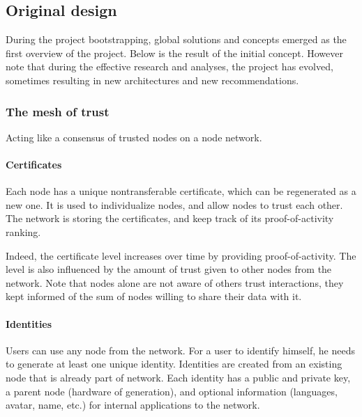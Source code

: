 
\subsection{Original design}
During the project bootstrapping, global solutions and concepts emerged as the first overview of the project. Below is the result of the initial concept. However note that during the effective research and analyses, the project has evolved, sometimes resulting in new architectures and new recommendations.

\subsubsection{The mesh of trust}
Acting like a consensus of trusted nodes on a node network.

\paragraph{Certificates} Each node has a unique nontransferable certificate, which can be regenerated as a new one. It is used to individualize nodes, and allow nodes to trust each other. The network is storing the certificates, and keep track of its proof-of-activity\cite{Bentov2013ProofStake} ranking.

Indeed, the certificate level increases over time by providing proof-of-activity. The level is also influenced by the amount of trust given to other nodes from the network. Note that nodes alone are not aware of others trust interactions, they kept informed of the sum of nodes willing to share their data with it.


\paragraph{Identities} Users can use any node from the network. For a user to identify himself, he needs to generate at least one unique identity. Identities are created from an existing node that is already part of network. Each identity has a public and private key, a parent node (hardware of generation), and optional information (languages, avatar, name, etc.) for internal applications to the network.

